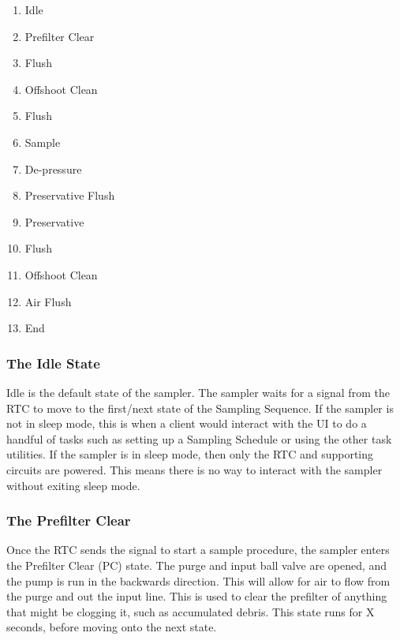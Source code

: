 \documentclass[11pt, letterpaper]{article}
\begin{document}


\begin{enumerate}
	\item Idle
	\item Prefilter Clear
	\item Flush
	\item Offshoot Clean
	\item Flush
	\item Sample
	\item De-pressure
	\item Preservative Flush
	\item Preservative
	\item Flush
	\item Offshoot Clean
	\item Air Flush
	\item End
\end{enumerate}	%


\subsubsection{The Idle State}
Idle is the default state of the sampler. The sampler waits for a signal from the RTC to move to the first/next state of the Sampling Sequence. If the sampler is not in sleep mode, this is when a client would interact with the UI to do a handful of tasks such as setting up a Sampling Schedule or using the other task utilities. If the sampler is in sleep mode, then only the RTC and supporting circuits are powered. This means there is no way to interact with the sampler without exiting sleep mode.

\subsubsection{The Prefilter Clear}
Once the RTC sends the signal to start a sample procedure, the sampler enters the Prefilter Clear (PC) state. The purge and input ball valve are opened, and the pump is run in the backwards direction. This will allow for air to flow from the purge and out the input line. This is used to clear the prefilter of anything that might be clogging it, such as accumulated debris. This state runs for X seconds, before moving onto the next state. 
\end{document}
